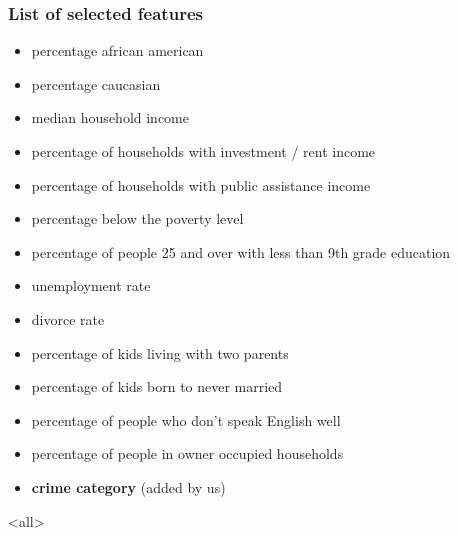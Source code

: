 \begin{frame}
  \frametitle{List of selected features}
  \onslide<+->
  \begin{itemize}
    \item<+-> percentage african american
    \item<+-> percentage caucasian
    \item<+-> median household income
    \item<+-> percentage of households with investment / rent income
    \item<+-> percentage of households with public assistance income
    \item<+-> percentage below the poverty level
    \item<+-> percentage of people 25 and over with less than 9th grade education
    \item<+-> unemployment rate
    \item<+-> divorce rate
    \item<+-> percentage of kids living with two parents
    \item<+-> percentage of kids born to never married
    \item<+-> percentage of people who don't speak English well
    \item<+-> percentage of people in owner occupied households
    \item<+-> \textbf{crime category} (added by us)
  \end{itemize}
\end{frame}

\mode<all>
